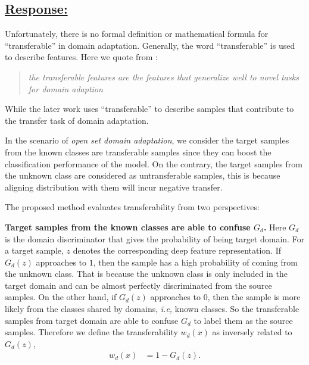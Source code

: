 \subsection*{\underline{\textbf{Response:}}}

Unfortunately, there is no formal definition or mathematical formula for ``transferable'' in domain adaptation.
Generally, the word ``transferable'' is used to describe features.
Here we quote from \cite{DeepAdaptationNetworks}:
\begin{quote}
    \textit{the transferable features are the features that generalize well to novel tasks for domain adaption}
\end{quote}
While the later work \cite{TransferableAttentionDA} uses ``transferable'' to describe samples that contribute to the transfer task of domain adaptation.

In the scenario of \textit{open set domain adaptation}, we consider the target samples from the known classes are transferable samples since they can boost the classification performance of the model.
On the contrary, the target samples from the unknown class are considered as untransferable samples, this is because aligning distribution with them will incur negative transfer.

The proposed method evaluates transferability from two perspectives:

\textbf{Target samples from the known classes are able to confuse $G_d$.}
Here $G_d$ is the domain discriminator that gives the probability of being target domain.
For a target sample, $z$ denotes the corresponding deep feature representation. 
If $G_d(z)$ approaches to $1$, then the sample has a high probability of coming from the unknown class.
That is because the unknown class is only included in the target domain and can be almost perfectly discriminated from the source samples.
On the other hand, if $G_d(z)$ approaches to $0$, then the sample is more likely from the classes shared by domains, \textit{i.e,} known classes.
So the transferable samples from target domain are able to confuse $G_d$ to label them as the source samples.
Therefore we define the transferability $w_d(x)$ as inversely related to $G_d(z)$,
\begin{align}
    w_d(x) &= 1-G_d(z). \label{eq: domain transferability}
\end{align}

